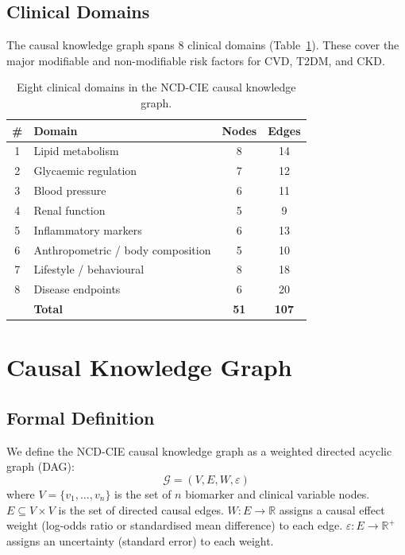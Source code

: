 \documentclass[runningheads]{llncs}
\begin{document}
\subsection{Clinical Domains}\label{sec:domains}

The causal knowledge graph spans 8 clinical domains
(Table~\ref{tab:domains}).
These cover the major modifiable and non-modifiable risk factors for
CVD, T2DM, and CKD.

\renewcommand{\arraystretch}{1.2}
\begin{table}[t]
\centering
\caption{Eight clinical domains in the NCD-CIE causal knowledge graph.}
\label{tab:domains}
\small
\begin{tabular}{@{}clcc@{}}
\toprule
\textbf{\#} & \textbf{Domain} & \textbf{Nodes} & \textbf{Edges} \\
\midrule
1 & Lipid metabolism        & 8  & 14 \\
2 & Glycaemic regulation    & 7  & 12 \\
3 & Blood pressure          & 6  & 11 \\
4 & Renal function          & 5  & 9  \\
5 & Inflammatory markers    & 6  & 13 \\
6 & Anthropometric / body composition & 5 & 10 \\
7 & Lifestyle / behavioural & 8  & 18 \\
8 & Disease endpoints       & 6  & 20 \\
\midrule
  & \textbf{Total}          & \textbf{51} & \textbf{107} \\
\bottomrule
\end{tabular}
\end{table}
\renewcommand{\arraystretch}{1.0}

\section{Causal Knowledge Graph}\label{sec:kg}

\subsection{Formal Definition}\label{sec:formal}

We define the NCD-CIE causal knowledge graph as a weighted directed
acyclic graph (DAG):
\begin{equation}\label{eq:graph}
\mathcal{G} = (V, E, W, \varepsilon)
\end{equation}
where $V=\{v_1,\ldots,v_n\}$ is the set of $n$ biomarker and clinical
variable nodes.
$E \subseteq V \times V$ is the set of directed causal edges.
$W: E \rightarrow \mathbb{R}$ assigns a causal effect weight
(log-odds ratio or standardised mean difference) to each edge.
$\varepsilon: E \rightarrow \mathbb{R}^+$ assigns an uncertainty
(standard error) to each weight.
\end{document}
